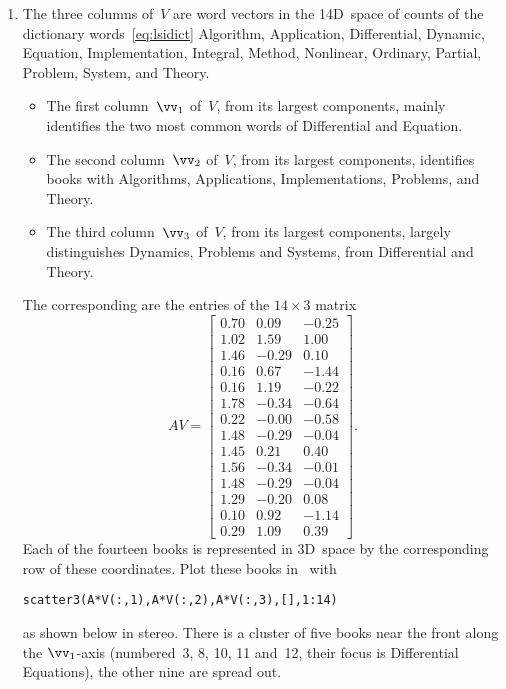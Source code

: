\begin{enumerate}
\item The three columns of~\(V\) are word vectors in the 14D~space of counts of the dictionary words~\eqref{eq:lsidict} Algorithm,
Application,
Differential,
Dynamic,
Equation,
Implementation,
Integral,
Method,
Nonlinear,
Ordinary,
Partial,
Problem,
System, and
Theory.
\begin{itemize}
\item The first column~\(\vv_1\) of~\(V\), from its largest components, mainly identifies the two most common words of Differential and Equation.
\item The second column~\(\vv_2\) of~\(V\), from its largest components, identifies books with Algorithms, Applications, Implementations, Problems, and Theory.
\item The third column~\(\vv_3\) of~\(V\), from its largest components, largely distinguishes Dynamics, Problems and Systems, from Differential and Theory.
\end{itemize}
The corresponding  are the entries of the \(14\times3\) matrix \twodp
\begin{equation*}
AV=\begin{bmatrix} 0.70 & 0.09 & -0.25
\\1.02 & 1.59 & 1.00
\\1.46 & -0.29 & 0.10
\\0.16 & 0.67 & -1.44
\\0.16 & 1.19 & -0.22
\\1.78 & -0.34 & -0.64
\\0.22 & -0.00 & -0.58
\\1.48 & -0.29 & -0.04
\\1.45 & 0.21 & 0.40
\\1.56 & -0.34 & -0.01
\\1.48 & -0.29 & -0.04
\\1.29 & -0.20 & 0.08
\\0.10 & 0.92 & -1.14
\\0.29 & 1.09 & 0.39 \end{bmatrix}.
\end{equation*}
Each of the fourteen books is represented in 3D~space by the corresponding row of these coordinates.
Plot these books in \script\ with 
\begin{verbatim}
scatter3(A*V(:,1),A*V(:,2),A*V(:,3),[],1:14)
\end{verbatim}
as shown below in stereo.
There is a cluster of five books near the front along the \(\vv_1\)-axis (numbered~3, 8, 10, 11 and~12, their focus is Differential Equations), the other nine are spread out.
\end{enumerate}



